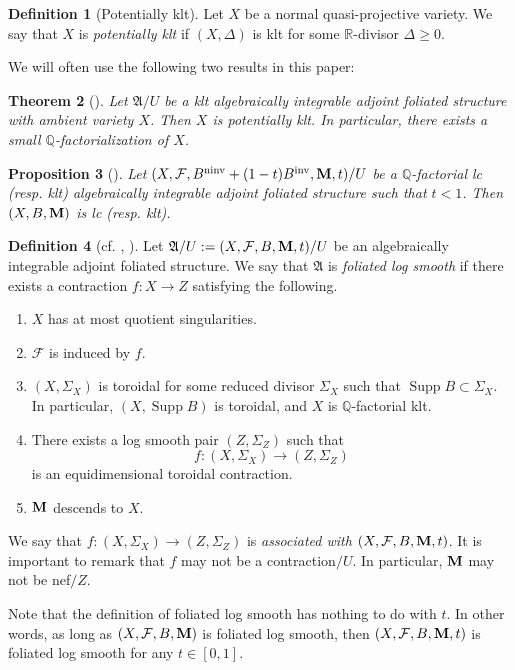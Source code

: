 \documentclass[12pt]{amsart}
\numberwithin{equation}{section}
\newcommand{\Mm}{{\bf{M}}}
\newcommand{\Qq}{\mathbb{Q}}
\newcommand{\Rr}{\mathbb{R}}
\newcommand{\ninv}{\operatorname{ninv}}
\newcommand{\inv}{\operatorname{inv}}
\newcommand{\Supp}{\operatorname{Supp}}
\newcommand{\Aa}{{\mathfrak{A}}}
\newcommand{\Ff}{\mathcal{F}}
\newtheorem{thm}{Theorem}[section]
\newtheorem{prop}[thm]{Proposition}
\theoremstyle{definition}
\newtheorem{defn}[thm]{Definition}
\theoremstyle{definition}
\theoremstyle{definition}
\begin{document}
\begin{defn}[Potentially klt]\label{defn: potentially klt}
Let $X$ be a normal quasi-projective variety. We say that $X$ is \emph{potentially klt} if $(X,\Delta)$ is klt for some $\Rr$-divisor $\Delta\geq 0$. 
\end{defn}

We will often use the following two results in this paper:

\begin{thm}[{\cite[Theorem 1.10(1)]{CHLMSSX24}}]\label{thm: klt afs implies potentially klt}
    Let $\Aa/U$ be a klt algebraically integrable adjoint foliated structure with ambient variety $X$. Then $X$ is potentially klt. In particular, there exists a small $\mathbb Q$-factorialization of $X$.
\end{thm}

\begin{prop}[{\cite[Proposition 3.3]{CHLMSSX24}}]\label{prop: lc Aat implies lc Aa0}
    Let $(X,\Ff,B^{\ninv}+(1-t)B^{\inv},\Mm,t)/U$ be a $\mathbb Q$-factorial lc (resp. klt) algebraically integrable adjoint foliated structure such that $t<1$. Then $(X,B,\Mm)$ is lc (resp. klt).
\end{prop}



\begin{defn}[{cf. \cite[3.2 Log canonical foliated pairs]{ACSS21}, \cite[Definition 6.2.1]{CHLX23}}]\label{defn: foliated log smooth}
Let $\Aa/U:=(X,\Ff,B,\Mm,t)/U$ be an algebraically integrable adjoint foliated structure. We say that $\Aa$ is \emph{foliated log smooth} if there exists a contraction $f: X\rightarrow Z$ satisfying the following.
\begin{enumerate}
  \item $X$ has at most quotient singularities.
  \item $\Ff$ is induced by $f$.
  \item $(X,\Sigma_X)$ is toroidal for some reduced divisor $\Sigma_X$ such that $\Supp B\subset\Sigma_X$.  In particular, $(X,\Supp B)$ is toroidal, and $X$ is $\Qq$-factorial klt.
  \item There exists a log smooth pair $(Z,\Sigma_Z)$ such that $$f: (X,\Sigma_X)\rightarrow (Z,\Sigma_Z)$$ is an equidimensional toroidal contraction.
  \item $\Mm$ descends to $X$.
\end{enumerate}
We say that $f: (X,\Sigma_X)\rightarrow (Z,\Sigma_Z)$ is \emph{associated with} $(X,\Ff,B,\Mm,t)$. It is important to remark that $f$ may not be a contraction$/U$. In particular, $\Mm$ may not be nef$/Z$.

Note that the definition of foliated log smooth has nothing to do with $t$. In other words, as long as $(X,\Ff,B,\Mm)$ is foliated log smooth, then $(X,\Ff,B,\Mm,t)$ is foliated log smooth for any 
$t \in [0, 1]$.
\end{defn}
\end{document}

